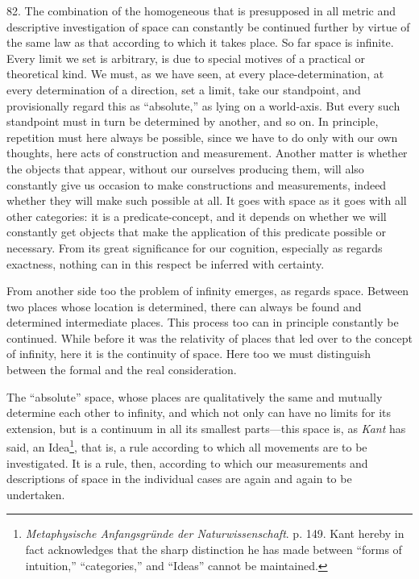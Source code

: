 \documentclass[12pt,a4paper]{book}
\newcommand{\opage}[1]{\marginnote{\footnotesize\textit{[#1]}}}
\begin{document}
82. The combination of the homogeneous that is presupposed in all metric and
descriptive investigation of space can constantly be continued further by
virtue of the same law as that according to which it takes place. So far
space is infinite. Every limit we set is arbitrary, is due to special motives
of a practical or theoretical kind. We must, as we have seen, at every
place-determination, at every determination of a direction, set a limit, take
our standpoint, and provisionally regard this as ``absolute,'' as lying on a
world-axis. But every such standpoint must in turn be determined by another,
and so on. In principle, repetition must here always be possible, since we
have to do only with our own thoughts, here acts of construction and
measurement. Another matter is whether the objects that appear, without our
ourselves producing them, will also constantly give us occasion to make
constructions and measurements, indeed whether they will make such possible
at all. It goes with space as it goes with all other categories: it is a
predicate-concept, and it depends on whether we will constantly get objects
that make the application of this predicate possible or necessary. From its
great significance for our cognition, especially as regards exactness,
nothing can in this respect be inferred with certainty.

From another side too the problem of infinity emerges, as regards space.
Between two places whose location is determined, there can always be found and
determined intermediate places. This process too can in principle constantly
be continued. While before it was the relativity of places that led over to
the concept of infinity, here it is the continuity of space. Here too we must
distinguish between the formal and the real consideration.

The ``absolute'' space, whose places are qualitatively the same and mutually
determine each other to infinity, and which not only can have no limits for
its extension, but is a continuum in all its smallest parts---this space is,
\opage{201}as \emph{Kant} has said, an Idea\footnote{\emph{Metaphysische Anfangsgründe
der Naturwissenschaft}. p. 149. Kant hereby in fact acknowledges that the
sharp distinction he has made between ``forms of intuition,'' ``categories,''
and ``Ideas'' cannot be maintained.}, that is, a rule according to which all
movements are to be investigated. It is a rule, then, according to which our
measurements and descriptions of space in the individual cases are again and
again to be undertaken.
\end{document}
